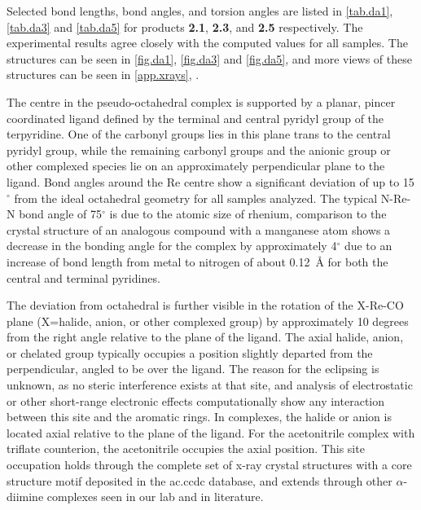 Selected bond lengths, bond angles, and torsion angles are listed in \autoref{tab.da1}, \autoref{tab.da3} and \autoref{tab.da5} for products \textbf{2.1}, \textbf{2.3}, and \textbf{2.5} respectively. The experimental results agree closely with the computed values for all samples. The structures can be seen in \autoref{fig.da1}, \autoref{fig.da3} and \autoref{fig.da5}, and more views of these structures can be seen in \autoref{app.xrays}, . 

The  centre in the pseudo-octahedral complex is supported by a planar, pincer coordinated ligand defined by the terminal and central pyridyl group of the terpyridine. One of the carbonyl groups lies in this plane trans to the central pyridyl group, while the remaining carbonyl groups and the anionic group or other complexed species lie on an approximately perpendicular plane to the ligand. Bond angles around the Re centre show a significant deviation of up to 15$^\circ$ from the ideal octahedral geometry for all samples analyzed. The typical N-Re-N bond angle of 75$^\circ$ is due to the atomic size of rhenium, comparison to the crystal structure of an analogous compound with a manganese atom\autocite{compain2014} shows a decrease in the bonding angle for the  complex by approximately 4$^\circ$ due to an increase of bond length from metal to nitrogen of about 0.12~\r{A} for both the central and terminal pyridines. 

The deviation from octahedral is further visible in the rotation of the X-Re-CO plane (X=halide, anion, or other complexed group) by approximately 10 degrees from the right angle relative to the plane of the ligand. The axial halide, anion, or chelated group typically occupies a position slightly departed from the perpendicular, angled to be over the ligand. The reason for the eclipsing is unknown, as no steric interference exists at that site, and analysis of electrostatic or other short-range electronic effects computationally show any interaction between this site and the aromatic rings. In  complexes, the halide or anion is located axial relative to the plane of the ligand. For the acetonitrile complex with triflate counterion, the acetonitrile occupies the axial position. This site occupation holds through the complete set of x-ray crystal structures with a  core structure motif deposited in the \gls{ac.ccdc} database\autocite{allen2002}, and extends through other $\alpha$-diimine complexes seen in our lab and in literature\autocite{jurca2013}. 

